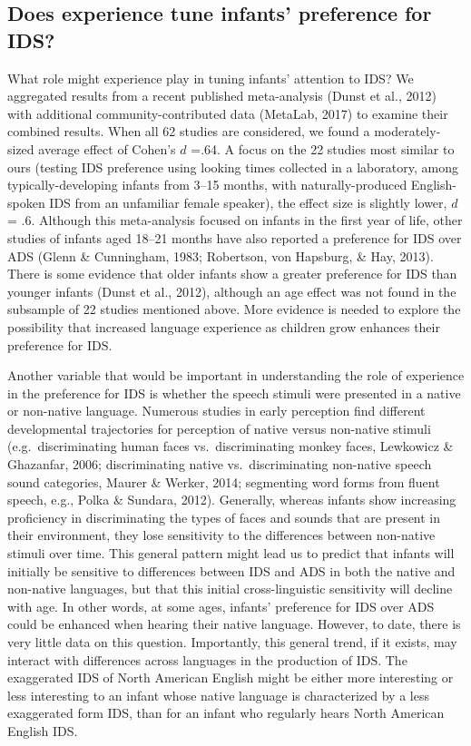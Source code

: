 \documentclass[,man,floatsintext]{apa6}
\begin{document}
\hypertarget{does-experience-tune-infants-preference-for-ids}{%
\subsection{Does experience tune infants' preference for IDS?}\label{does-experience-tune-infants-preference-for-ids}}

What role might experience play in tuning infants' attention to IDS? We aggregated results from a recent published meta-analysis (Dunst et al., 2012) with additional community-contributed data (MetaLab, 2017) to examine their combined results. When all 62 studies are considered, we found a moderately-sized average effect of Cohen's \(d\) =.64. A focus on the 22 studies most similar to ours (testing IDS preference using looking times collected in a laboratory, among typically-developing infants from 3--15 months, with naturally-produced English-spoken IDS from an unfamiliar female speaker), the effect size is slightly lower, \(d\) = .6. Although this meta-analysis focused on infants in the first year of life, other studies of infants aged 18--21 months have also reported a preference for IDS over ADS (Glenn \& Cunningham, 1983; Robertson, von Hapsburg, \& Hay, 2013). There is some evidence that older infants show a greater preference for IDS than younger infants (Dunst et al., 2012), although an age effect was not found in the subsample of 22 studies mentioned above. More evidence is needed to explore the possibility that increased language experience as children grow enhances their preference for IDS.

Another variable that would be important in understanding the role of experience in the preference for IDS is whether the speech stimuli were presented in a native or non-native language. Numerous studies in early perception find different developmental trajectories for perception of native versus non-native stimuli (e.g.~discriminating human faces vs.~discriminating monkey faces, Lewkowicz \& Ghazanfar, 2006; discriminating native vs.~discriminating non-native speech sound categories, Maurer \& Werker, 2014; segmenting word forms from fluent speech, e.g., Polka \& Sundara, 2012). Generally, whereas infants show increasing proficiency in discriminating the types of faces and sounds that are present in their environment, they lose sensitivity to the differences between non-native stimuli over time. This general pattern might lead us to predict that infants will initially be sensitive to differences between IDS and ADS in both the native and non-native languages, but that this initial cross-linguistic sensitivity will decline with age. In other words, at some ages, infants' preference for IDS over ADS could be enhanced when hearing their native language. However, to date, there is very little data on this question. Importantly, this general trend, if it exists, may interact with differences across languages in the production of IDS. The exaggerated IDS of North American English might be either more interesting or less interesting to an infant whose native language is characterized by a less exaggerated form IDS, than for an infant who regularly hears North American English IDS.
\end{document}
